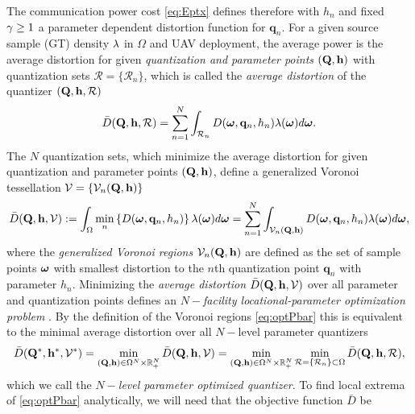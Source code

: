 \documentclass[12pt,onecolumn,journal,draftclsnofoot,letterpaper]{IEEEtran}
\renewcommand{\vp}{\mathbf q}
\renewcommand{\vP}{\mathbf Q}
\newcommand{\df}{\ensuremath{\lam}}         %
\newcommand{\bH}{\ensuremath{\vh}}          %
\newcommand{\Vor}{\ensuremath{\mathcal{V}}}         %
\newcommand{\Rset}{\ensuremath{\mathcal R}}
\newcommand{\Dis}{\ensuremath{D}}                    %
\newcommand{\AvDis}{\ensuremath{\bar{\Dis}}}         %
\begin{document}
The communication power cost \eqref{eq:Eptx} defines therefore with $h_n$ and fixed $\gamma\geq 1$ a parameter dependent
distortion function for $\vp_n$. For a given source sample (GT) density $\df$ in $\Omega$ and UAV deployment, the
average power is the average distortion for given \emph{quantization and parameter points} $(\vP,\vh)$ with quantization
sets $\Rset=\{\Rset_n\}$, which is called the \emph{average distortion} of the quantizer $(\vP,\vh,\Rset)$
%
\begin{equation}
 \AvDis(\vP,\vh,\Rset)
  = \sum_{n=1}^N \int_{\Rset_n} D(\vome,\vp_n,h_n)\lam(\vome)d\vome.
  \label{eq:Pbar}
\end{equation}
%
The $N$ quantization sets, which minimize the average distortion for 
given quantization and parameter points $(\vP,\vh)$, define a generalized Voronoi tessellation $\Vor=\{\Vor_n(\vP,\vh)\}$
%
\begin{align}
  \AvDis(\vP,\vh,\Vor)
  :=\int_{\Omega}\min_{n} \left\{ \Dis(\vome,\vp_n,h_n) \right\} \df(\vome)d\vome 
  =\sum_{n=1}^{N}\int_{\Vor_n(\vP,\vh)}\Dis(\vome,\vp_n,h_n) \df(\vome)d\vome 
  \label{eq:optPbar},
\end{align}
%
where the \emph{generalized Voronoi regions} $\Vor_n(\vP,\vh)$ are defined as the set of sample points $\boldsymbol{ \omega}$ with
smallest distortion to the $n$th quantization point $\vp_n$ with parameter $h_n$.  Minimizing the
\emph{average distortion} $\AvDis(\vP,\vh,\Vor)$ over all parameter and quantization points defines an
\emph{$N-$facility locational-parameter optimization problem} \cite{GJ, GJcom18, GJ18,OBSC00}. By the definition of the
Voronoi regions \eqref{eq:optPbar} this is equivalent to the minimal average distortion over all $N-$level parameter
quantizers%
%
\begin{align}
  \AvDis(\vP^*,\vh^*,\Vor^*)
  = \min_{(\vP,\vh)\in\Ome^N\times\R_+^N} \AvDis(\vP,\vh,\Vor)
  = \min_{(\vP,\vh)\in\Ome^N\times\R_+^N} \min_{\Rset=\{\Rset_n\}\subset\Ome} \AvDis(\vP,\vh,\Rset), 
\label{eq:optquanteqoptdeploy}
\end{align}
%
which we call the \emph{$N-$level parameter optimized quantizer}.
%
%
%
To find local extrema of \eqref{eq:optPbar} analytically, we will need that the objective function $\AvDis$ be
\end{document}
